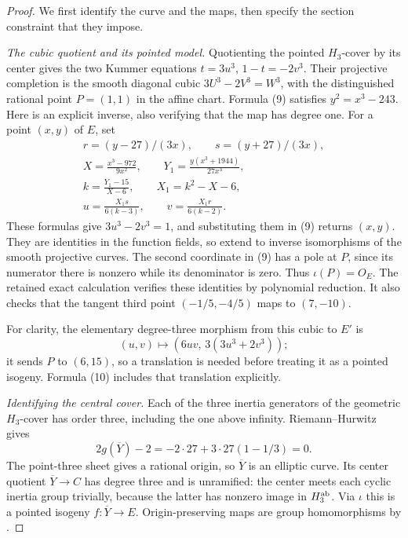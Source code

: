 \begin{proof}
We first identify the curve and the maps, then specify
the section constraint that they impose.

\emph{The cubic quotient and its pointed model.}
Quotienting the pointed \(H_3\)-cover by its center
gives the two Kummer equations
\(t=3u^3\), \(1-t=-2v^3\). Their projective
completion is the smooth diagonal cubic
\(3U^3-2V^3=W^3\), with the distinguished rational
point \(P=(1,1)\) in the affine chart. Formula (9)
satisfies \(y^2=x^3-243\). Here is an explicit
inverse, also verifying that the map has degree one.
For a point \((x,y)\) of \(E\), set
\[
 \begin{gathered}
 r=(y-27)/(3x),\qquad s=(y+27)/(3x),\\
 X=\frac{x^3-972}{9x^2},\qquad
 Y_1=\frac{y(x^3+1944)}{27x^3},\\
 k=\frac{Y_1-15}{X-6},\qquad X_1=k^2-X-6,\\
 u=\frac{X_1s}{6(k-3)},\qquad
 v=\frac{X_1r}{6(k-2)}.
 \end{gathered}                                      \tag{10}
\]
These formulas give \(3u^3-2v^3=1\), and substituting
them in (9) returns \((x,y)\). They are identities
in the function fields, so extend to inverse
isomorphisms of the smooth projective curves. The
second coordinate in (9) has a pole at \(P\),
since its numerator there is nonzero while its
denominator is zero. Thus \(\iota(P)=O_E\).
The retained exact calculation
verifies these identities by polynomial reduction.
It also checks that the tangent third point
\((-1/5,-4/5)\) maps to \((7,-10)\).

For clarity, the elementary degree-three morphism
from this cubic to \(E'\) is
\[
       (u,v)\longmapsto
        (6uv,\,3(3u^3+2v^3));
\]
it sends \(P\) to \((6,15)\), so a translation
is needed before treating it as a pointed isogeny.
Formula (10) includes that translation explicitly.

\emph{Identifying the central cover.}
Each of the three inertia generators of the
geometric \(H_3\)-cover has order three, including
the one above infinity. Riemann--Hurwitz gives
\[
 2g(\overline Y)-2=-2\cdot27
                  +3\cdot27(1-1/3)=0.
\]
The point-three sheet gives a rational origin, so
\(\overline Y\) is an elliptic curve. Its center
quotient \(\overline Y\to C\) has degree three
and is unramified: the center meets each cyclic
inertia group trivially, because the latter has
nonzero image in \(H_3^{\rm ab}\). Via \(\iota\)
this is a pointed isogeny
\(f:\overline Y\to E\).
Origin-preserving maps are group homomorphisms by
\cite[II.1.5--1.6]{GhostMilneEC}.


\end{proof}
